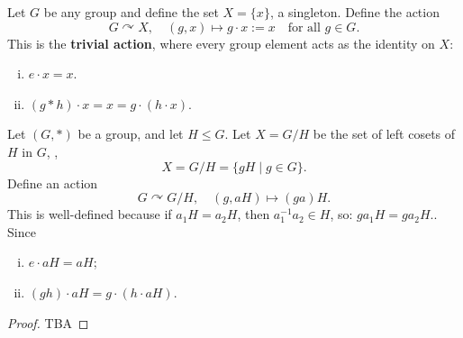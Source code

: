 \documentclass[11pt,openany]{article}
\begin{document}
\newpage
\begin{example*}
Let \( G \) be any group and define the set \( X = \{x\} \), a singleton. Define the action
\[
G \curvearrowright X, \quad (g,x)\mapsto g \cdot x := x \quad \text{for all } g \in G.
\] This is the \textbf{trivial action}, where every group element acts as the identity on \( X \):
\begin{enumerate}[(i)]
	\item \( e \cdot x = x \).
	\item \( (g\ast h) \cdot x = x = g \cdot (h \cdot x) \).
\end{enumerate}
\end{example*}
\vfill
\begin{example*}
Let $(G,\ast)$ be a group, and let \( H \leq G \). Let \( X = G/H \) be the set of left cosets of \( H \) in \( G \), \ie,
\[
X = G/H = \{ gH \mid g \in G \}.
\] Define an action \[
G \curvearrowright G/H, \quad (g, aH) \mapsto (ga)H.
\] This is well-defined because if \( a_1H = a_2H \), then \( a_1^{-1}a_2 \in H \), so: $
g a_1 H = g a_2 H.$. Since \begin{enumerate}[(i)]
	\item \( e \cdot aH = aH \);
	\item \( (gh) \cdot aH = g \cdot (h \cdot aH) \).
\end{enumerate}
\end{example*}
\vfill
{}
\begin{proof}
	TBA
\end{proof}
\end{document}
